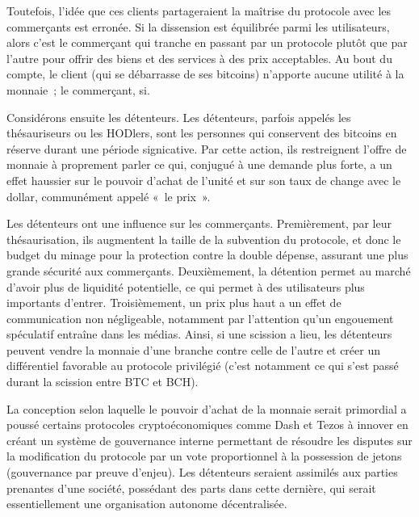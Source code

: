 Toutefois, l'idée que ces clients partageraient la maîtrise du protocole avec les commerçants est erronée. Si la dissension est équilibrée parmi les utilisateurs, alors c'est le commerçant qui tranche en passant par un protocole plutôt que par l'autre pour offrir des biens et des services à des prix acceptables. Au bout du compte, le client (qui se débarrasse de ses bitcoins) n'apporte aucune utilité à la monnaie~; le commerçant, si.


Considérons ensuite les détenteurs. Les détenteurs, parfois appelés les thésauriseurs ou les HODlers, sont les personnes qui conservent des bitcoins en réserve durant une période signicative. Par cette action, ils restreignent l'offre de monnaie à proprement parler ce qui, conjugué à une demande plus forte, a un effet haussier sur le pouvoir d'achat de l'unité et sur son taux de change avec le dollar, communément appelé «~le prix~».

Les détenteurs ont une influence sur les commerçants. Premièrement, par leur thésaurisation, ils augmentent la taille de la subvention du protocole, et donc le budget du minage pour la protection contre la double dépense, assurant une plus grande sécurité aux commerçants. Deuxièmement, la détention permet au marché d'avoir plus de liquidité potentielle, ce qui permet à des utilisateurs plus importants d'entrer. Troisièmement, un prix plus haut a un effet de communication non négligeable, notamment par l'attention qu'un engouement spéculatif entraîne dans les médias. Ainsi, si une scission a lieu, les détenteurs peuvent vendre la monnaie d'une branche contre celle de l'autre et créer un différentiel favorable au protocole privilégié (c'est notamment ce qui s'est passé durant la scission entre BTC et BCH).

La conception selon laquelle le pouvoir d'achat de la monnaie serait primordial a poussé certains protocoles cryptoéconomiques comme Dash et Tezos à innover en créant un système de gouvernance interne permettant de résoudre les disputes sur la modification du protocole par un vote proportionnel à la possession de jetons (gouvernance par preuve d'enjeu). Les détenteurs seraient assimilés aux parties prenantes d'une société, possédant des parts dans cette dernière, qui serait essentiellement une organisation autonome décentralisée.

